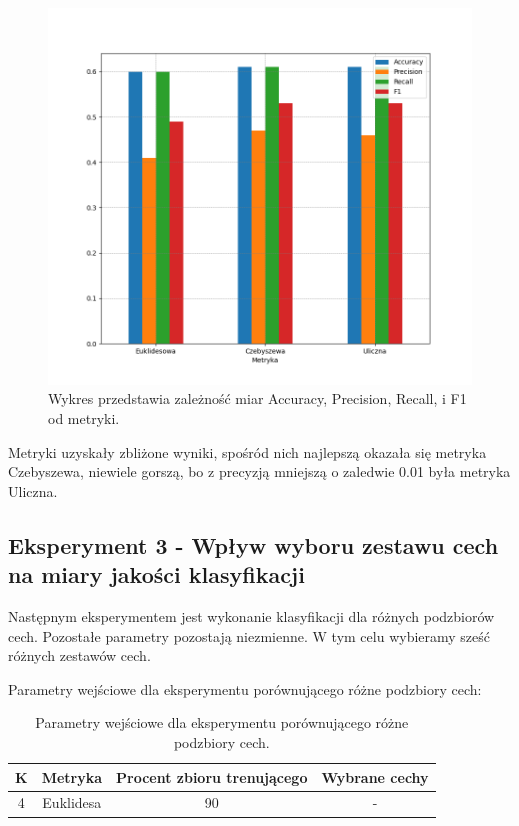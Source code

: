 \documentclass{classrep}
\begin{document}
\newpage

\begin{figure}[h!]
 \centering
 \includegraphics[width=15cm]{wykres_metryka.png}
 \vspace{-0.3cm}
 \caption{Wykres przedstawia zależność miar Accuracy, Precision, Recall, i F1 od metryki.}
 \label{wykres2}
\end{figure}

Metryki uzyskały zbliżone wyniki, spośród nich najlepszą okazała się metryka Czebyszewa, niewiele gorszą, bo z precyzją mniejszą o zaledwie 0.01 była metryka Uliczna. \\



\subsection{Eksperyment 3 - Wpływ wyboru zestawu cech na miary jakości klasyfikacji}
\label{subsection:ex3}
Następnym eksperymentem jest wykonanie klasyfikacji dla różnych podzbiorów cech. Pozostałe parametry pozostają niezmienne. W tym celu wybieramy sześć różnych zestawów cech. 

Parametry wejściowe dla eksperymentu porównującego różne podzbiory cech:
 
\begin{table}[h!]
\caption{Parametry wejściowe dla eksperymentu porównującego różne podzbiory cech. }
\centering
\vspace{0.1cm}
 \begin{tabular}{c c c c}
    \textbf{K} & \textbf{Metryka}   & \textbf{Procent zbioru trenującego}  & \textbf{Wybrane cechy}   \\
\hline
4 & Euklidesa & 90 & -\\
\end {tabular}
\label {Parametry wejściowe dla eksperymentu porównującego różne podzbiory cech. }
\end{table}
\end{document}
